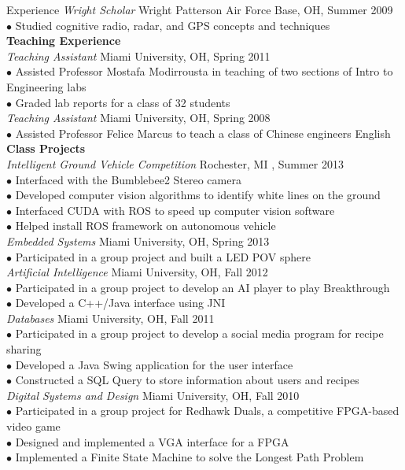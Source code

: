 \documentclass{resume} %
\begin{document}
\begin{rSection}{Experience}
  \textit{Wright Scholar} \hfill Wright Patterson Air Force Base, OH, Summer 2009 \\ [1 mm]
  $\bullet$ Studied cognitive radio, radar, and GPS concepts and techniques \\[3 mm]
  \textbf{Teaching Experience}\\[1 mm]
  \textit{Teaching Assistant} \hfill Miami University, OH, Spring 2011 \\ [1 mm]
  $\bullet$ Assisted Professor Mostafa Modirrousta in teaching of two sections of Intro to Engineering labs\\
  $\bullet$ Graded lab reports for a class of 32 students \\ [3 mm]
  \textit{Teaching Assistant} \hfill Miami University, OH, Spring 2008 \\ [1 mm]
  $\bullet$ Assisted Professor Felice Marcus to teach a class of Chinese engineers English \\[3 mm]
  \textbf{Class Projects}\\[1 mm]
  \textit{Intelligent Ground Vehicle Competition} \hfill Rochester, MI , Summer 2013 \\ [1 mm]
  $\bullet$ Interfaced with the Bumblebee2 Stereo camera \\
  $\bullet$ Developed computer vision algorithms to identify white lines on the ground \\
  $\bullet$ Interfaced CUDA with ROS to speed up computer vision software \\
  $\bullet$ Helped install ROS framework on autonomous vehicle \\[1 mm]
  \textit{Embedded Systems} \hfill Miami University, OH, Spring 2013\\
  $\bullet$ Participated in a group project and built a LED POV sphere\\[1 mm]
  \textit{Artificial Intelligence} \hfill Miami University, OH, Fall 2012\\
  $\bullet$ Participated in a group project to develop an AI player to play Breakthrough\\
  $\bullet$ Developed a C++/Java interface using JNI\\ 
  \textit{Databases} \hfill Miami University, OH, Fall 2011\\
  $\bullet$ Participated in a group project to develop a social media program for recipe sharing \\
  $\bullet$ Developed a Java Swing application for the user interface \\
  $\bullet$ Constructed a SQL Query to store information about users and recipes\\[1 mm]
  \textit{Digital Systems and Design} \hfill Miami University, OH, Fall 2010\\
  $\bullet$ Participated in a group project for Redhawk Duals, a competitive FPGA-based video game\\
  $\bullet$ Designed and implemented a VGA interface for a FPGA\\
  $\bullet$ Implemented a Finite State Machine to solve the Longest Path Problem\\ \newpage
\end{rSection}
\end{document}
